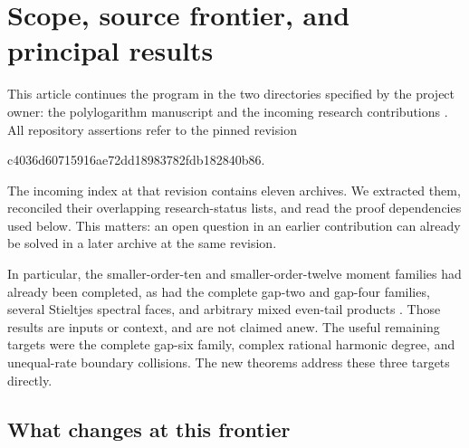 \section{Scope, source frontier, and principal results}
\label{scope:section}

This article continues the program in the two directories specified
by the project owner: the polylogarithm manuscript and the incoming
research contributions \cite{RepoManuscript,RepoIncoming}. All
repository assertions refer to the pinned revision
\begin{center}\small\ttfamily
c4036d60715916ae72dd18983782fdb182840b86.
\end{center}
The incoming index at that revision contains eleven archives.
We extracted them, reconciled their overlapping research-status
lists, and read the proof dependencies used below. This matters:
an open question in an earlier contribution can already be solved
in a later archive at the same revision.

In particular, the smaller-order-ten and smaller-order-twelve
moment families had already been completed, as had the complete
gap-two and gap-four families, several Stieltjes spectral faces,
and arbitrary mixed even-tail products
\cite{BilinearIncoming,TailKernelsIncoming,OrderedIncoming,LatticeIncoming}.
Those results are inputs or context, and are not claimed anew.
The useful remaining targets were the complete gap-six family,
complex rational harmonic degree, and unequal-rate boundary
collisions. The new theorems address these three targets directly.

\subsection{What changes at this frontier}

